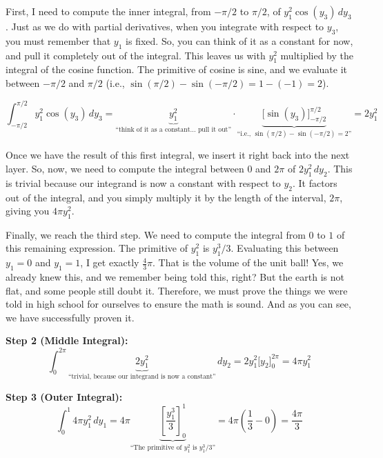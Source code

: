 \begin{spoken-clean}[00:12:46 - 00:14:05]
First, I need to compute the inner integral, from $-\pi/2$ to $\pi/2$, of $y_1^2 \cos(y_3) \, dy_3$. Just as we do with partial derivatives, when you integrate with respect to $y_3$, you must remember that $y_1$ is fixed. So, you can think of it as a constant for now, and pull it completely out of the integral. This leaves us with $y_1^2$ multiplied by the integral of the cosine function. The primitive of cosine is sine, and we evaluate it between $-\pi/2$ and $\pi/2$ (i.e., $\sin(\pi/2) - \sin(-\pi/2) = 1 - (-1) = 2$).
\end{spoken-clean}

\begin{math-stroke}
\[
\int_{-\pi/2}^{\pi/2} y_1^2 \cos(y_3) \, dy_3 = \underbrace{y_1^2}_{\text{``think of it as a constant... pull it out''}} \cdot \underbrace{\Big[ \sin(y_3) \Big]_{-\pi/2}^{\pi/2}}_{\text{``i.e., } \sin(\pi/2) - \sin(-\pi/2) = 2\text{''}} = 2y_1^2 
\]
\end{math-stroke}

\begin{spoken-clean}[00:14:05 - 00:15:00]
Once we have the result of this first integral, we insert it right back into the next layer. So, now, we need to compute the integral between $0$ and $2\pi$ of $2y_1^2 \, dy_2$. This is trivial because our integrand is now a constant with respect to $y_2$. It factors out of the integral, and you simply multiply it by the length of the interval, $2\pi$, giving you $4\pi y_1^2$. 

Finally, we reach the third step. We need to compute the integral from $0$ to $1$ of this remaining expression. The primitive of $y_1^2$ is $y_1^3 / 3$. Evaluating this between $y_1 = 0$ and $y_1 = 1$, I get exactly $\frac{4}{3}\pi$. That is the volume of the unit ball! Yes, we already knew this, and we remember being told this, right? But the earth is not flat, and some people still doubt it. Therefore, we must prove the things we were told in high school for ourselves to ensure the math is sound. And as you can see, we have successfully proven it.
\end{spoken-clean}

\begin{math-stroke}
\textbf{Step 2 (Middle Integral):}
\[ 
\int_{0}^{2\pi} \underbrace{2y_1^2}_{\text{``trivial, because our integrand is now a constant''}} \, dy_2 = 2y_1^2 \Big[ y_2 \Big]_{0}^{2\pi} = 4\pi y_1^2 
\]

\textbf{Step 3 (Outer Integral):}
\[ 
\int_{0}^{1} 4\pi y_1^2 \, dy_1 = 4\pi \underbrace{\left[ \frac{y_1^3}{3} \right]_0^1}_{\text{``The primitive of } y_1^2 \text{ is } y_1^3 / 3 \text{''}} = 4\pi \left( \frac{1}{3} - 0 \right) = \frac{4\pi}{3} 
\]
\end{math-stroke}
